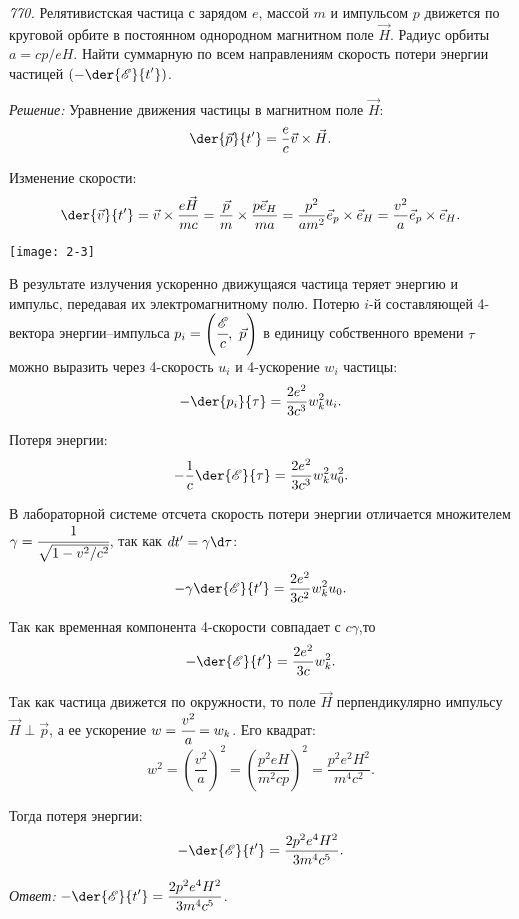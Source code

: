 \newpage

\emph{770.} Релятивистская частица с зарядом \( e \), массой \( m \) и импульсом
\( p \) движется по круговой орбите в постоянном однородном магнитном поле
\( \vec{H} \). Радиус орбиты \( a = cp/eH \). Найти суммарную по всем
направлениям скорость потери энергии частицей \( \ds \left(-\der{\E}
{t'}\right) \).

\vspace*{2em}
\emph{Решение:}
Уравнение движения частицы в магнитном поле \( \vec{H} \):
\[
    \der{\vec{p}}{t'} = \frac{e}{c}\vec{v}\times\vec{H}.
\]

Изменение скорости:
\[
    \der{\vec{v}}{t'} = \vec{v}\times\frac{e\vec{H}}{mc} = \frac{\vec{p}}{m}
    \times\frac{p\vec{e}_H}{ma} = \frac{p^2}{am^2}\vec{e}_p\times\vec{e}_H =
    \frac{v^2}{a}\vec{e}_p\times\vec{e}_H.
\]

\begin{minipage}{.4\textwidth}
    \texttt{[image: 2-3]}
\end{minipage}
\begin{minipage}{.55\textwidth}
В результате излучения ускоренно движущаяся частица теряет энергию и импульс,
передавая их электромагнитному полю. Потерю \( i \)-й составляющей 4-вектора
энергии--импульса \( p_i = \left( \cfrac{\mathscr{E}}{c},\ \vec{p} \right) \) в единицу
собственного времени \( \tau \) можно выразить через 4-скорость \( u_i \) и
4-ускорение \( w_i \) частицы:
\[
    -\der{p_i}{\tau} = \frac{2e^2}{3c^3} w_k^2 u_i.
\]
\end{minipage}

Потеря энергии:
\[
    -\frac{1}{c}\der{\E}{\tau} = \frac{2e^2}{3c^3} w_k^2 u_0^2.
\]

В лабораторной системе отсчета скорость потери энергии отличается множителем
\( \gamma = \cfrac{1}{\sqrt{1-v^2/c^2}} \), так как \( dt' = \gamma\d\tau \):
\[
    -\gamma\der{\E}{t'} = \frac{2e^2}{3c^2} w_k^2 u_0.
\]

Так как временная компонента 4-скорости совпадает с \( c\gamma \),то
\[
    -\der{\E}{t'} = \frac{2e^2}{3c} w_k^2.
\]

Так как частица движется по окружности, то поле \( \vec{H} \) перпендикулярно
импульсу \( \vec{H} \perp \vec{p} \), а ее ускорение \( w = \cfrac{v^2}{a} =
w_k \). Его квадрат:
\[
    w^2 = \left(\frac{v^2}{a}\right)^2 = \left(\frac{p^2eH}{m^2cp}\right)^2 =
    \frac{p^2e^2H^2}{m^4c^2}.
\]

Тогда потеря энергии:
\[
    -\der{\E}{t'} = \frac{2p^2e^4H^2}{3m^4c^5}.
\]

\vspace*{2em}
\emph{Ответ:} \( \ds -\der{\E}{t'} = \frac{2p^2e^4H^2}{3m^4c^5} \).

